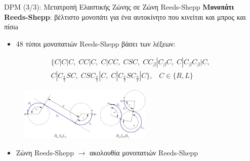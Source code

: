 \documentclass[10pt, compress]{beamer}
\begin{document}
\begin{frame}{DPM (3/3): Μετατροπή Ελαστικής Ζώνης σε Ζώνη Reeds-Shepp}
\textbf{Μονοπάτι Reeds-Shepp}: βέλτιστο μονοπάτι για ένα αυτοκίνητο που κινείται και μπρος και πίσω
	\begin{itemize}
		\item 48 τύποι μονοπατιών Reeds-Shepp βάσει των λέξεων:
	\end{itemize}
	\vspace{-0.4cm}
	\begin{align*}
		\{C|C|C,\;CC|C,\;C|CC,\;CSC,\;CC_{\beta}|C_{\beta}C,\;	C|C_{\beta}C_{\beta}|C,\;\nonumber\\C|C_{\frac{\pi}{2}}SC,\;CSC_{\frac{\pi}{2}}|C,\;C|C_{\frac{\pi}{2}}SC_{\frac{\pi}2}|C\},\;\;\; C \in \{R,L\}
	\end{align*}

	\vspace{-0.5cm}	
	\begin{figure}
		\includegraphics[height=2.5cm]{Figures/reeds_shepp_paths.png}
	\end{figure}

	\vspace{-0.2cm}	
	\begin{itemize}
		\item Ζώνη Reeds-Shepp $\rightarrow$ ακολουθία μονοπατιών Reeds-Shepp
	\end{itemize}
	
	\vspace{-0.5cm}
	\begin{figure}
		\captionsetup[subfigure]{labelformat=empty}
		 \hspace{0.5cm}
		 \hspace{0.5cm}
	\end{figure}
\end{frame}
\end{document}
